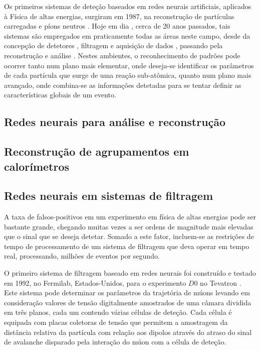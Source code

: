 Os primeiros sistemas de deteção baseados em redes neurais artificiais,
aplicados à Física de altas energias, surgiram em 1987, na reconstrução de
partículas carregadas e píons neutros \cite{denby-nim-1997}. Hoje em dia
\cite{denby-nim-2004}, cerca de 20 anos passados, tais sistemas são empregados
em praticamente todas as áreas neste campo, desde da concepção de detetores
\cite{wilk-nim-2006}, filtragem e aquisição de dados
\cite{denby-nim-2003, kohne-nim-1997, varela-cms-1998},
passando pela reconstrução  \cite{peterson-nim-1988} e análise
\cite{kiesling-nim-2004}. Nestes ambientes, o reconhecimento de padrões pode
ocorrer tanto num plano mais elementar, onde deseja-se identificar os
parâmetros de cada partícula que surge de uma reação sub-atômica, quanto num
plano mais avançado, onde combina-se as informações detetadas para se tentar
definir as características globais de um evento.

\subsection{Redes neurais para análise e reconstrução }

\subsection{Reconstrução de agrupamentos em calorímetros}

\subsection{Redes neurais em sistemas de filtragem}

A taxa de falsos-positivos em um experimento em física de altas energias pode
ser bastante grande, chegando muitas vezes a ser ordens de magnitude mais
elevadas que o sinal que se deseja detetar. Somado a este fator, incluem-se as
restrições de tempo de processamento de um sistema de filtragem que deva
operar em tempo real, processando, milhões de eventos por segundo.

O primeiro sistema de filtragem baseado em redes neurais foi construído e
testado em 1992, no Fermilab, Estados-Unidos, para o experimento $D0$ no
Tevatron \cite{lindsey-nim-1992}. Este sistema pode determinar os parâmetros
da trajetória de múons levando em consideração valores de tensão digitalmente
amostrados de uma câmara dividida em três planos, cada um contendo várias
células de deteção. Cada célula é equipada com placas coletoras de tensão que
permitem a amostragem da distância relativa da partícula com relação aos
dipolos através do atraso do sinal de avalanche disparado pela interação do
múon com a célula de deteção.

